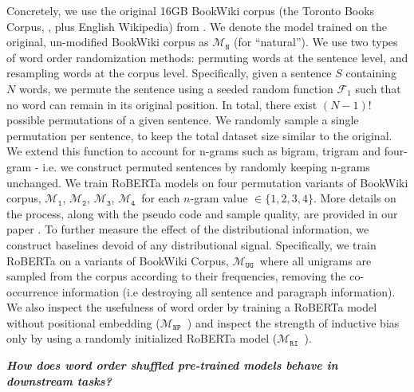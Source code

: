 \documentclass[12pt]{article}
\newcommand{\xit}[1]{{\noindent\textbf{\textit{#1}}}}
\newcommand{\OR}{$\mathcal{M}_{\texttt{N}}$}
\newcommand{\RI}{$\mathcal{M}_{\texttt{1}}$}
\newcommand{\RII}{$\mathcal{M}_{\texttt{2}}$}
\newcommand{\RIII}{$\mathcal{M}_{\texttt{3}}$}
\newcommand{\RIV}{$\mathcal{M}_{\texttt{4}}$}
\newcommand{\RC}{$\mathcal{M}_{\texttt{UG}}$}
\newcommand{\RT}{$\mathcal{M}_{\texttt{RI}}$}
\newcommand{\NP}{$\mathcal{M}_{\texttt{NP}}$}
\begin{document}
Concretely, we use the original 16GB BookWiki corpus (the Toronto Books Corpus, \citealt{zhu2015aligning}, plus English Wikipedia) from \citet{liu2019b}. We denote the model trained on the original, un-modified BookWiki corpus as \OR{} (for ``natural''). We use two types of word order randomization methods: permuting words at the sentence level, and resampling words at the corpus level. Specifically, given a sentence $S$ containing $N$ words, we permute the sentence using a seeded random function $\mathcal{F}_1$ such that no word can remain in its original position. In total, there exist $(N-1)!$ possible permutations of a given sentence. We randomly sample a single permutation per sentence, to keep the total dataset size similar to the original. We extend this function to account for n-grams such as bigram, trigram and four-gram - i.e. we construct permuted sentences by randomly keeping n-grams unchanged. We train RoBERTa models on four permutation variants of BookWiki corpus, \RI, \RII, \RIII, \RIV\ for each $n$-gram value $ \in {\{1,2,3,4\}}$. More details on the process, along with the pseudo code and sample quality, are provided in our paper \cite{sinha2021a}. To further measure the effect of the distributional information, we construct baselines devoid of any distributional signal. Specifically, we train RoBERTa on a variants of BookWiki Corpus, \RC\, where all unigrams are sampled from the corpus according to their frequencies, removing the co-occurrence information (i.e destroying all sentence and paragraph information). We also inspect the usefulness of word order by training a RoBERTa model without positional embedding (\NP\ ) and inspect the strength of inductive bias only by using a randomly initialized RoBERTa model (\RT\ ).

\blankline

\xit{How does word order shuffled pre-trained models behave in downstream tasks?}
\end{document}
